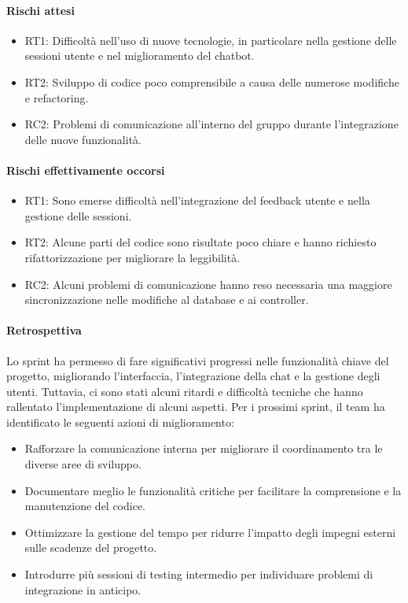 \documentclass{article}
\begin{document}
            \paragraph{Rischi attesi}
            \begin{itemize}
                \item RT1: Difficoltà nell’uso di nuove tecnologie, in particolare nella gestione delle sessioni utente e nel miglioramento del chatbot.
                \item RT2: Sviluppo di codice poco comprensibile a causa delle numerose modifiche e refactoring.
                \item RC2: Problemi di comunicazione all’interno del gruppo durante l'integrazione delle nuove funzionalità.
            \end{itemize}
            
            \paragraph{Rischi effettivamente occorsi}
            \begin{itemize}
                \item RT1: Sono emerse difficoltà nell'integrazione del feedback utente e nella gestione delle sessioni.
                \item RT2: Alcune parti del codice sono risultate poco chiare e hanno richiesto rifattorizzazione per migliorare la leggibilità.
                \item RC2: Alcuni problemi di comunicazione hanno reso necessaria una maggiore sincronizzazione nelle modifiche al database e ai controller.
            \end{itemize}
            
            \paragraph{Retrospettiva}
            Lo sprint ha permesso di fare significativi progressi nelle funzionalità chiave del progetto, migliorando l'interfaccia, l'integrazione della chat e la gestione degli utenti. Tuttavia, ci sono stati alcuni ritardi e difficoltà tecniche che hanno rallentato l'implementazione di alcuni aspetti. Per i prossimi sprint, il team ha identificato le seguenti azioni di miglioramento:
            \begin{itemize}
                \item Rafforzare la comunicazione interna per migliorare il coordinamento tra le diverse aree di sviluppo.
                \item Documentare meglio le funzionalità critiche per facilitare la comprensione e la manutenzione del codice.
                \item Ottimizzare la gestione del tempo per ridurre l'impatto degli impegni esterni sulle scadenze del progetto.
                \item Introdurre più sessioni di testing intermedio per individuare problemi di integrazione in anticipo.
            \end{itemize}
                
\end{document}
